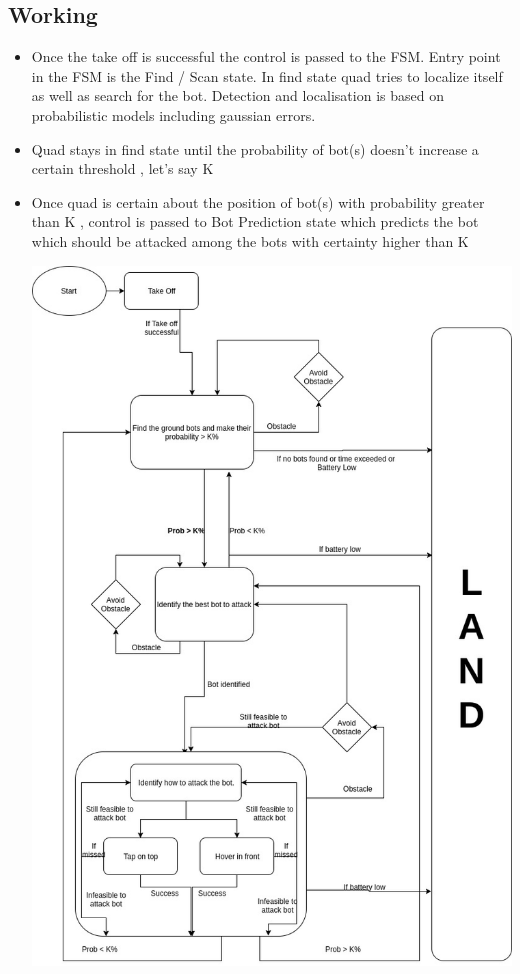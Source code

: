 \documentclass[12pt]{article}
\begin{document}
\subsection{Working}
\begin{itemize}
\item{Once the take off is successful the control is passed to the FSM. Entry point in the FSM is the Find / Scan state. In find state quad tries to localize itself as well as search for the bot. Detection and localisation is based on probabilistic models including gaussian errors.
}
\item{Quad stays in find state until the probability of bot(s) doesn't increase a certain threshold , let's say K%
}
\item{Once quad is certain about the position of bot(s) with probability greater than K , control is passed to Bot Prediction state which predicts the bot which should be attacked among the bots with certainty higher than K%
}
\begin{center}
\includegraphics[scale=0.4]{st_mcn} \\

\end{center}
\end{itemize}
\end{document}
